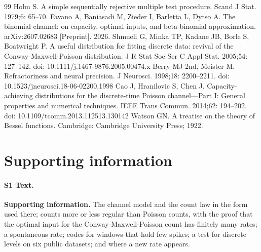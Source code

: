\documentclass[10pt,letterpaper]{article}
\begin{document}
\begin{thebibliography}{99}
 Holm S. A simple sequentially rejective multiple test procedure. Scand J Stat. 1979;6: 65--70.
 Favano A, Baniasadi M, Zieder I, Barletta L, Dytso A. The binomial channel: on capacity, optimal inputs, and beta-binomial approximation. arXiv:2607.02683 [Preprint]. 2026.
 Shmueli G, Minka TP, Kadane JB, Borle S, Boatwright P. A useful distribution for fitting discrete data: revival of the Conway-Maxwell-Poisson distribution. J R Stat Soc Ser C Appl Stat. 2005;54: 127--142. doi: 10.1111/j.1467-9876.2005.00474.x
 Berry MJ 2nd, Meister M. Refractoriness and neural precision. J Neurosci. 1998;18: 2200--2211. doi: 10.1523/jneurosci.18-06-02200.1998
 Cao J, Hranilovic S, Chen J. Capacity-achieving distributions for the discrete-time Poisson channel---Part I: General properties and numerical techniques. IEEE Trans Commun. 2014;62: 194--202. doi: 10.1109/tcomm.2013.112513.130142
 Watson GN. A treatise on the theory of Bessel functions. Cambridge: Cambridge University Press; 1922.
\end{thebibliography}

\section*{Supporting information}

\paragraph*{S1 Text.}
\label{S1_Text}
{\bf Supporting information.} The channel model and the count law in the form used there; counts more or less regular than Poisson counts, with the proof that the optimal input for the Conway-Maxwell-Poisson count has finitely many rates; a spontaneous rate; codes for windows that hold few spikes; a test for discrete levels on six public datasets; and where a new rate appears.

\nolinenumbers
\end{document}
